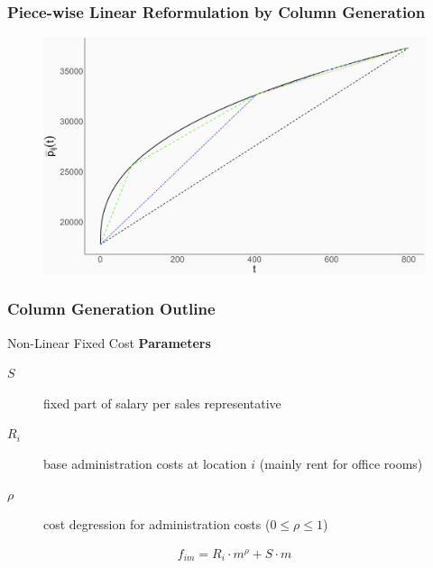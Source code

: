 \documentclass[xcolor=dvipsnames,aspectratio=169, handout, mathserif]{beamer}
\begin{document}
\begin{frame}
\frametitle{Piece-wise Linear Reformulation by Column Generation}
\begin{center}
\begin{figure}
    \centering
    \includegraphics[width=0.8\linewidth]{p8.png}
\end{figure}
\end{center}
\end{frame}

\begin{frame}
\frametitle{Column Generation Outline}
\begin{center}
\scalebox{0.55}{

}
\end{center}
\end{frame}




\begin{frame}{Non-Linear Fixed Cost}
\textbf{Parameters}
    \begin{description}
	  \item[$S$]  fixed part of salary per sales representative
  \item[$R_i$] base administration costs at location $i$ (mainly rent for office rooms) 
  \item[$\rho$] cost degression for administration costs ($0\leq \rho \leq 1$)
\end{description}
\vfill
\begin{align}
    f_{im} = R_i \cdot m^\rho + S \cdot m
\end{align}
\end{frame}
\end{document}

